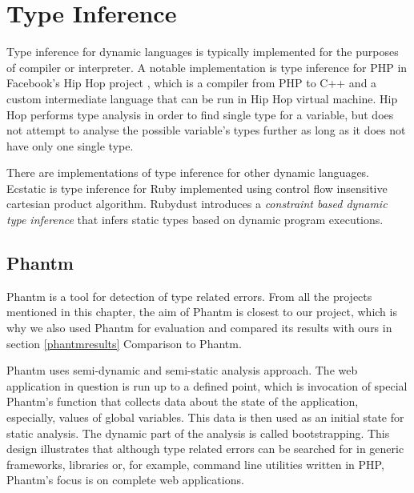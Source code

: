    \section{Type Inference}
    
    Type inference for dynamic languages is typically implemented 
    for the purposes of compiler or interpreter. A notable implementation 
    is type inference for PHP in Facebook's Hip Hop project \cite{zhao2012hiphop}, 
    which is a compiler from PHP to C++ and a custom intermediate language 
    that can be run in Hip Hop virtual machine. Hip Hop performs type 
    analysis in order to find single type for a variable, but does not attempt 
    to analyse the possible variable's types further as long as it 
    does not have only one single type. 
        
    There are implementations of type inference for other dynamic languages. 
    Ecstatic\cite{madsen2007ecstatic} is type inference for Ruby 
    implemented using control flow insensitive cartesian product algorithm. 
    Rubydust\cite{an2011dynamic} introduces a \emph{constraint based dynamic 
    type inference} that infers static types based on dynamic program 
    executions.

    \subsection{Phantm}
    
    Phantm\cite{kneuss2010phantm} is a tool for detection of type related 
    errors. From all the projects mentioned in this chapter, the aim of 
    Phantm is closest to our project, which is why we also used Phantm 
    for evaluation and compared its results with ours in 
    section \ref{phantmresults} Comparison to Phantm.
    
    Phantm uses semi-dynamic and semi-static analysis approach. The web 
    application in question is run up to a defined point, which is invocation 
    of special Phantm's function that collects data about the state of the application, 
    especially, values of global variables. This data is then used as an initial 
    state for static analysis. The dynamic part of the analysis is called bootstrapping. 
    This design illustrates that although type related errors can be searched for 
    in generic frameworks, libraries or, for example, command line utilities 
    written in PHP, Phantm's focus is on complete web applications.
    
    
    
    
    
    
    
    
    
